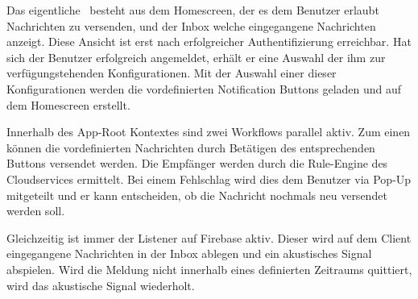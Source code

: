 Das eigentliche~\emph{} besteht aus dem Homescreen,
der es dem Benutzer erlaubt Nachrichten zu versenden, und der Inbox welche eingegangene Nachrichten anzeigt.
Diese Ansicht ist erst nach erfolgreicher Authentifizierung erreichbar.
Hat sich der Benutzer erfolgreich angemeldet, erhält er eine Auswahl der ihm zur verfügungstehenden Konfigurationen.
Mit der Auswahl einer dieser Konfigurationen werden die vordefinierten Notification Buttons geladen und auf dem Homescreen erstellt.

Innerhalb des App-Root Kontextes sind zwei Workflows parallel aktiv.
Zum einen können die vordefinierten Nachrichten durch Betätigen des entsprechenden Buttons versendet werden.
Die Empfänger werden durch die Rule-Engine des Cloudservices ermittelt.
Bei einem Fehlschlag wird dies dem Benutzer via Pop-Up mitgeteilt und er kann entscheiden, ob die Nachricht nochmals neu versendet werden soll.

Gleichzeitig ist immer der Listener auf Firebase aktiv.
Dieser wird auf dem Client eingegangene Nachrichten in der Inbox ablegen und ein akustisches Signal abspielen.
Wird die Meldung nicht innerhalb eines definierten Zeitraums quittiert, wird das akustische Signal wiederholt.
\clearpage

